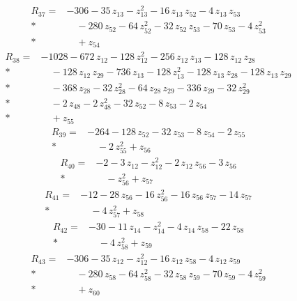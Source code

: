 \documentclass[10pt]{article}
\begin{document}
\begin{align*}
R_{37}={}& - 306 - 35\,z_{13} - z_{13}^{2} - 16\,z_{13}\,z_{52} - 4\,z_{13}\,z_{53} \\*
&\quad - 280\,z_{52} - 64\,z_{52}^{2} - 32\,z_{52}\,z_{53} - 70\,z_{53} - 4\,z_{53}^{2} \\*
&\quad + z_{54}
\end{align*}
\begin{align*}
R_{38}={}& - 1028 - 672\,z_{12} - 128\,z_{12}^{2} - 256\,z_{12}\,z_{13} - 128\,z_{12}\,z_{28} \\*
&\quad - 128\,z_{12}\,z_{29} - 736\,z_{13} - 128\,z_{13}^{2} - 128\,z_{13}\,z_{28} - 128\,z_{13}\,z_{29} \\*
&\quad - 368\,z_{28} - 32\,z_{28}^{2} - 64\,z_{28}\,z_{29} - 336\,z_{29} - 32\,z_{29}^{2} \\*
&\quad - 2\,z_{48} - 2\,z_{48}^{2} - 32\,z_{52} - 8\,z_{53} - 2\,z_{54} \\*
&\quad + z_{55}
\end{align*}
\begin{align*}
R_{39}={}& - 264 - 128\,z_{52} - 32\,z_{53} - 8\,z_{54} - 2\,z_{55} \\*
&\quad - 2\,z_{55}^{2} + z_{56}
\end{align*}
\begin{align*}
R_{40}={}& - 2 - 3\,z_{12} - z_{12}^{2} - 2\,z_{12}\,z_{56} - 3\,z_{56} \\*
&\quad - z_{56}^{2} + z_{57}
\end{align*}
\begin{align*}
R_{41}={}& - 12 - 28\,z_{56} - 16\,z_{56}^{2} - 16\,z_{56}\,z_{57} - 14\,z_{57} \\*
&\quad - 4\,z_{57}^{2} + z_{58}
\end{align*}
\begin{align*}
R_{42}={}& - 30 - 11\,z_{14} - z_{14}^{2} - 4\,z_{14}\,z_{58} - 22\,z_{58} \\*
&\quad - 4\,z_{58}^{2} + z_{59}
\end{align*}
\begin{align*}
R_{43}={}& - 306 - 35\,z_{12} - z_{12}^{2} - 16\,z_{12}\,z_{58} - 4\,z_{12}\,z_{59} \\*
&\quad - 280\,z_{58} - 64\,z_{58}^{2} - 32\,z_{58}\,z_{59} - 70\,z_{59} - 4\,z_{59}^{2} \\*
&\quad + z_{60}
\end{align*}
\end{document}
